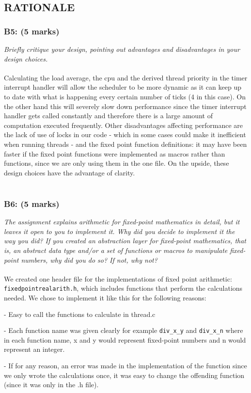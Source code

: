 \documentclass{article}
\begin{document}
\subsection{RATIONALE}

\subsubsection*{B5: (5 marks) }
\textit{Briefly critique your design, pointing out advantages and disadvantages in your design choices.}
\\ \\
 Calculating the load average, the cpu and the derived thread priority in the
  timer interrupt handler will allow the scheduler to be more dynamic as it can
  keep up to date with what is happening every certain number of ticks (4 in this case).
  On the other hand this will severely slow down performance since the timer interrupt
  handler gets called constantly and therefore there is a large amount of computation
  executed frequently.
Other disadvantages affecting performance are the lack of use of locks in our code - which in some cases could make it inefficient when running threads - and the fixed point function definitions: it may have been faster if the fixed point functions were implemented as macros rather than functions, since we are only using them in the one file. On the upside, these design choices have the advantage of clarity.
\\ \\

\subsubsection*{B6: (5 marks) }
\textit{The assignment explains arithmetic for fixed-point mathematics in detail, but it leaves it open to you to implement it.  Why did you decide to implement it the way you did?  If you created an abstraction layer for fixed-point mathematics, that is, an abstract data type and/or a set of functions or macros to manipulate fixed-point numbers, why did you do so?  If not, why not?}
\\ \\
We created one header file for the implementations of fixed point arithmetic: \texttt{fixedpointrealarith.h}, which includes functions that perform the calculations needed.
We chose to implement it like this for the following reasons:

    - Easy to call the functions to calculate in thread.c
    
	- Each function name was given clearly for example \texttt{div\_x\_y} and \texttt{div\_x\_n}
	  where in each function name, x and y would represent fixed-point numbers
	  and n would represent an integer.
      
	- If for any reason, an error was made in the implementation of the function
      since we only wrote the calculations once, it was easy to change the offending
      function (since it was only in the .h file).
\end{document}
